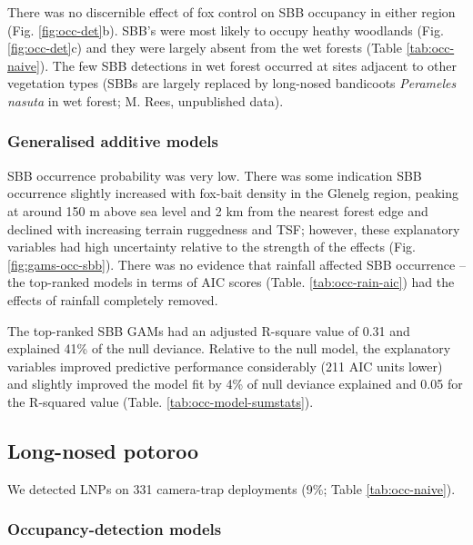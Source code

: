 \documentclass[]{elsarticle} %
\begin{document}
There was no discernible effect of fox control on SBB occupancy in either region (Fig. \ref{fig:occ-det}b). SBB's were most likely to occupy heathy woodlands (Fig. \ref{fig:occ-det}c) and they were largely absent from the wet forests (Table \ref{tab:occ-naive}). The few SBB detections in wet forest occurred at sites adjacent to other vegetation types (SBBs are largely replaced by long-nosed bandicoots \emph{Perameles nasuta} in wet forest; M. Rees, unpublished data).

\hypertarget{generalised-additive-models-3}{%
\subsubsection{Generalised additive models}\label{generalised-additive-models-3}}

SBB occurrence probability was very low. There was some indication SBB occurrence slightly increased with fox-bait density in the Glenelg region, peaking at around 150 m above sea level and 2 km from the nearest forest edge and declined with increasing terrain ruggedness and TSF; however, these explanatory variables had high uncertainty relative to the strength of the effects (Fig. \ref{fig:gams-occ-sbb}). There was no evidence that rainfall affected SBB occurrence -- the top-ranked models in terms of AIC scores (Table. \ref{tab:occ-rain-aic}) had the effects of rainfall completely removed.

The top-ranked SBB GAMs had an adjusted R-square value of 0.31 and explained 41\% of the null deviance. Relative to the null model, the explanatory variables improved predictive performance considerably (211 AIC units lower) and slightly improved the model fit by 4\% of null deviance explained and 0.05 for the R-squared value (Table. \ref{tab:occ-model-sumstats}).

\hypertarget{long-nosed-potoroo}{%
\subsection{Long-nosed potoroo}\label{long-nosed-potoroo}}

We detected LNPs on 331 camera-trap deployments (9\%; Table \ref{tab:occ-naive}).

\hypertarget{occupancy-detection-models-4}{%
\subsubsection{Occupancy-detection models}\label{occupancy-detection-models-4}}
\end{document}
